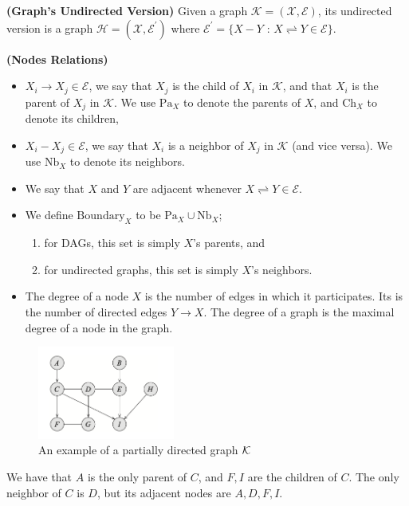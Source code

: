 \documentclass{article}
\newcommand{\bfs}[1]{\textbf{({#1}) }}
\begin{document}
\begin{defa}\bfs{Graph’s Undirected Version}
Given a graph $\mathcal{K}=(\mathcal{X}, \mathcal{E})$, its undirected version is a graph $\mathcal{H}=\left(\mathcal{X}, \mathcal{E}^{\prime}\right)$ where $\mathcal{E}^{\prime}=\{X-Y$ : $X \rightleftharpoons Y \in \mathcal{E}\} .$
\end{defa}
\begin{defa}\bfs{Nodes Relations}
\begin{itemize}
    \item {} $X_{i} \rightarrow X_{j} \in \mathcal{E}$, we say that $X_{j}$ is the child of $X_{i}$ in $\mathcal{K}$, and that $X_{i}$ is the parent of $X_{j}$ in $\mathcal{K}$. We use  $\mathrm{Pa}_{X}$ to denote the parents of $X$, and $\mathrm{Ch}_{X}$ to denote its children,
    \item {} $X_{i}-X_{j} \in \mathcal{E}$, we say that $X_{i}$ is a neighbor of $X_{j}$ in $\mathcal{K}$ (and vice versa). We use $\mathrm{Nb}_{X}$ to denote its neighbors.
    \item {} We say that $X$ and $Y$ are adjacent whenever $X \rightleftharpoons Y \in \mathcal{E}$. 
    \item {} We define $\mathrm{Boundary}_{X}$ to be $\mathrm{Pa}_{X} \cup \mathrm{Nb}_{X}$;
    \begin{enumerate}
        \item for DAGs, this set is simply $X$'s parents, and
        \item for undirected graphs, this set is simply $X$'s neighbors. 
    \end{enumerate} 
    \item {} The degree of a node $X$ is the number of edges in which it participates. Its  is the number of directed edges $Y \rightarrow X$. The degree of a graph is the maximal degree of a node in the graph.
\end{itemize}
\end{defa}
\begin{exma}\label{ex:ffdze}
\begin{figure}
    \centering
    \includegraphics[width=0.4\textwidth]{Figs/a1.png}
    \caption{An example of a partially directed graph $\mathcal{K}$}
    \label{fig:pa_di_gra}
\end{figure}
 We have that $A$ is the only parent of $C$, and $F, I$ are the children of $C$. The only neighbor of $C$ is $D$, but its adjacent nodes are $A, D, F, I$. 
\end{exma}
\end{document}
